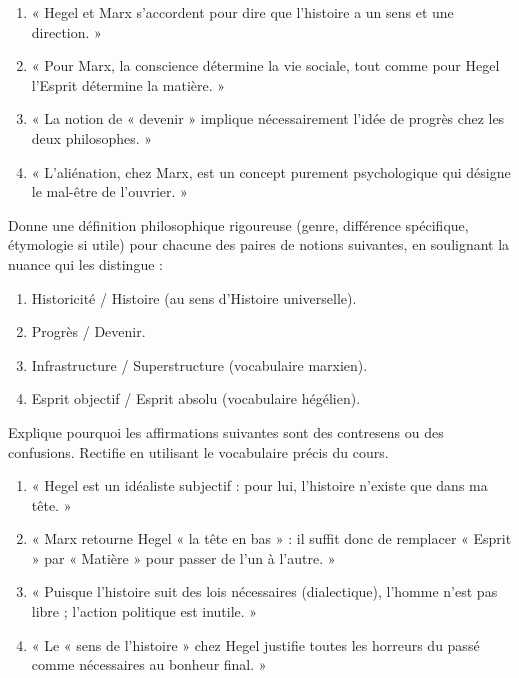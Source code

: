 \documentclass[11pt]{article}
\newcommand{\cle}[1]{{\popxbold\color{popdark}#1}}
\begin{document}
\begin{exercice}
\begin{enumerate}
\item « Hegel et Marx s'accordent pour dire que l'histoire a un sens et une direction. »
\item « Pour Marx, la conscience détermine la vie sociale, tout comme pour Hegel l'Esprit détermine la matière. »
\item « La notion de « devenir » implique nécessairement l'idée de progrès chez les deux philosophes. »
\item « L'aliénation, chez Marx, est un concept purement psychologique qui désigne le mal-être de l'ouvrier. »
\end{enumerate}
\end{exercice}

\begin{exercice}
Donne une définition philosophique rigoureuse (genre, différence spécifique, étymologie si utile) pour chacune des paires de notions suivantes, en soulignant la nuance qui les distingue :
\begin{enumerate}
\item \cle{Historicité} / \cle{Histoire} (au sens d'Histoire universelle).
\item \cle{Progrès} / \cle{Devenir}.
\item \cle{Infrastructure} / \cle{Superstructure} (vocabulaire marxien).
\item \cle{Esprit objectif} / \cle{Esprit absolu} (vocabulaire hégélien).
\end{enumerate}
\end{exercice}

\begin{attention}
Explique pourquoi les affirmations suivantes sont des contresens ou des confusions. Rectifie en utilisant le vocabulaire précis du cours.
\begin{enumerate}
\item « Hegel est un idéaliste subjectif : pour lui, l'histoire n'existe que dans ma tête. »
\item « Marx retourne Hegel « la tête en bas » : il suffit donc de remplacer « Esprit » par « Matière » pour passer de l'un à l'autre. »
\item « Puisque l'histoire suit des lois nécessaires (dialectique), l'homme n'est pas libre ; l'action politique est inutile. »
\item « Le « sens de l'histoire » chez Hegel justifie toutes les horreurs du passé comme nécessaires au bonheur final. »
\end{enumerate}
\end{attention}
\end{document}
